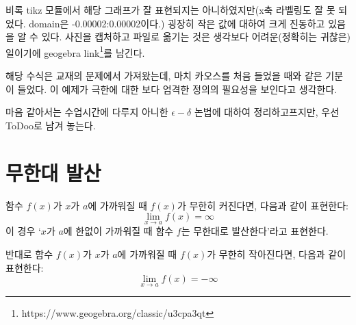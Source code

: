 \documentclass[../note.tex]{subfiles}
\begin{document}
\begin{example}
\begin{center}
  \end{center}
  비록  tikz 모듈에서 해당 그래프가 잘 표현되지는 아니하였지만(x축 라벨링도 잘 못 되었다. domain은 -0.00002:0.00002이다.) 굉장히 작은 값에 대하여 크게 진동하고 있음을 알 수 있다. 사진을 캡처하고 파일로 옮기는 것은 생각보다 어려운(정확히는 귀찮은) 일이기에 geogebra link\footnote{https://www.geogebra.org/classic/u3cpa3qt}를 남긴다.
  
  해당 수식은 교재의 문제에서 가져왔는데, 마치 카오스를 처음 들었을 때와 같은 기분이 들었다. 이 예제가 극한에 대한 보다 엄격한 정의의 필요성을 보인다고 생각한다.
\end{example}

마음 같아서는 수업시간에 다루지 아니한 $\epsilon-\delta$ 논법에 대하여 정리하고프지만, 우선 ToDoo로 남겨 놓는다.

\section{무한대 발산}
\begin{definition}[무한대 발산]
  함수 $f(x)$가 $x$가 $a$에 가까워질 때 $f(x)$가 무한히 커진다면, 다음과 같이 표현한다:
  \begin{equation}
    \lim_{x \to a} f(x) = \infty
  \end{equation}
  이 경우 `$x$가 $a$에 한없이 가까워질 때 함수 $f$는 무한대로 발산한다'라고 표현한다.

  반대로 함수 $f(x)$가 $x$가 $a$에 가까워질 때 $f(x)$가 무한히 작아진다면, 다음과 같이 표현한다:
  \begin{equation}
    \lim_{x \to a} f(x) = -\infty
  \end{equation}
\end{definition}
\end{document}
